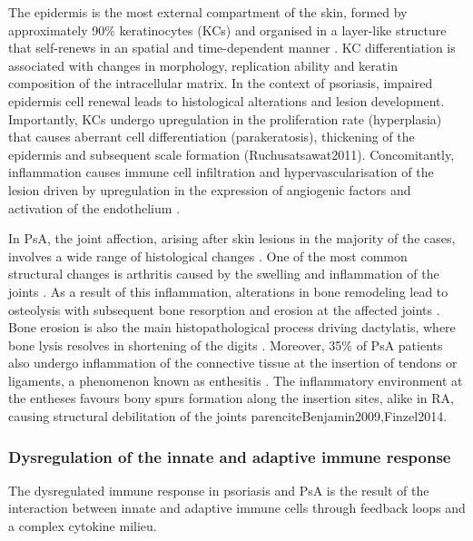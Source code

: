 The epidermis is the most external compartment of the skin, formed by approximately 90\% keratinocytes (KCs) and organised in a layer-like structure that self-renews in an spatial and time-dependent manner \parencite{Wikramanayake2014}. KC differentiation is associated with changes in morphology, replication ability and keratin composition of the intracellular matrix. In the context of psoriasis, impaired epidermis cell renewal leads to histological alterations and lesion development. Importantly, KCs undergo upregulation in the proliferation rate (hyperplasia) that causes aberrant cell differentiation (parakeratosis), thickening of the epidermis and subsequent scale formation (Ruchusatsawat2011). Concomitantly, inflammation causes immune cell infiltration and hypervascularisation of the lesion driven by upregulation in the expression of angiogenic factors and activation of the endothelium \parencite{Perera2012}.  

In PsA, the joint affection, arising after skin lesions in the majority of the cases, involves a wide range of histological changes \parencite{Haddad2013}. One of the most common structural changes is arthritis caused by the swelling and inflammation of the joints \parencite{Schett2011}. As a result of this inflammation, alterations in bone remodeling lead to osteolysis with subsequent bone resorption and erosion at the affected joints \parencite{Mensah2017}. Bone erosion is also the main histopathological process driving dactylatis, where bone lysis resolves in shortening of the digits \parencite{Gladman2005}. Moreover, 35\% of PsA patients also undergo inflammation of the connective tissue at the insertion of tendons or ligaments, a phenomenon known as enthesitis \parencite{McGonagle2011,Polachek2017}. The inflammatory environment at the entheses favours bony spurs formation along the insertion sites, alike in RA, causing structural debilitation of the joints parencite{Benjamin2009,Finzel2014}.

 


\subsubsection*{Dysregulation of the innate and adaptive immune response}
The dysregulated immune response in psoriasis and PsA is the result of the interaction between innate and adaptive immune cells through feedback loops and a complex cytokine milieu. 

